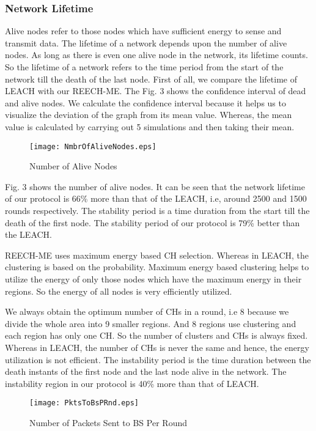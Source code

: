 \documentclass[journal]{IEEEtran}
\begin{document}
\subsubsection{Network Lifetime}
Alive nodes refer to those nodes which have sufficient energy to sense and transmit data. The lifetime of a network depends upon the number of alive nodes. As long as there is even one alive node in the network, its lifetime counts. So the lifetime of a network refers to the time period from the start of the network till the death of the last node. First of all, we compare the lifetime of LEACH with our REECH-ME. The Fig. 3 shows the confidence interval of dead and alive nodes. We calculate the confidence interval because it helps us to visualize the deviation of the graph from its mean value. Whereas, the mean value is calculated by carrying out 5 simulations and then taking their mean.

\begin{figure}[!h]
\centering
\texttt{[image: NmbrOfAliveNodes.eps]}
\caption{Number of Alive Nodes}
\end{figure}

Fig. 3 shows the number of alive nodes. It can be seen that the network lifetime of our protocol is 66\% more than that of the LEACH, i.e, around 2500 and 1500 rounds respectively. The stability period is a time duration from the start till the death of the first node. The stability period of our protocol is 79\% better than the LEACH.

REECH-ME uses maximum energy based CH selection. Whereas in LEACH, the clustering is based on the probability. Maximum energy based clustering helps to utilize the energy of only those nodes which have the maximum energy in their regions. So the energy of all nodes is very efficiently utilized.

We always obtain the optimum number of CHs in a round, i.e 8 because we divide the whole area into 9 smaller regions. And 8 regions use clustering and each region has only one CH. So the number of clusters and CHs is always fixed. Whereas in LEACH, the number of CHs is never the same and hence, the energy utilization is not efficient. The instability period is the time duration between the death instants of the first node and the last node alive in the network. The instability region in our protocol is 40\% more than that of LEACH.
\begin{figure}[!h]
\centering
\texttt{[image: PktsToBsPRnd.eps]}
\caption{Number of Packets Sent to BS Per Round}
\end{figure}
\end{document}

